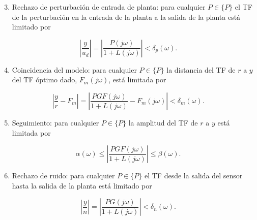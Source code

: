 \begin{enumerate}
  \setcounter{enumi}{2}
  \item Rechazo de perturbación de entrada de planta: para cualquier $P \in\{P\}$ el TF de la perturbación en la entrada de la planta a la salida de la planta está limitado por
\end{enumerate}
$$
\left|\frac{y}{u_{d}}\right|=\left|\frac{P(j \omega)}{1+L(j \omega)}\right|<\delta_{p}(\omega) .
$$

\begin{enumerate}
  \setcounter{enumi}{3}
  \item Coincidencia del modelo: para cualquier $P \in\{P\}$ la distancia del TF de $r$ a $y$ del TF óptimo dado, $F_{m}(j \omega)$, está limitada por
\end{enumerate}
$$
\left|\frac{y}{r}-F_{m}\right|=\left|\frac{P G F(j \omega)}{1+L(j \omega)}-F_{m}(j \omega)\right|<\delta_{m}(\omega) .
$$

\begin{enumerate}
  \setcounter{enumi}{4}
  \item Seguimiento: para cualquier $P \in\{P\}$ la amplitud del TF de $r$ a $y$ está limitada por
\end{enumerate}
$$
\alpha(\omega) \leq\left|\frac{P G F(j \omega)}{1+L(j \omega)}\right| \leq \beta(\omega) .
$$

\begin{enumerate}
  \setcounter{enumi}{5}
  \item Rechazo de ruido: para cualquier $P \in\{P\}$ el TF desde la salida del sensor hasta la salida de la planta está limitado por
\end{enumerate}
$$
\left|\frac{y}{n}\right|=\left|\frac{P G(j \omega)}{1+L(j \omega)}\right|<\delta_{n}(\omega) .
$$

